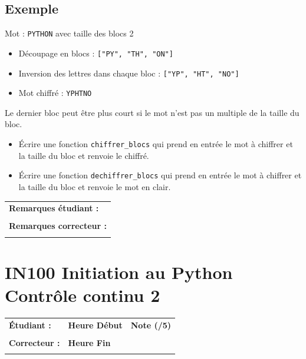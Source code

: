 \documentclass[a4paper,11pt]{article}
\begin{document}
\subsection*{Exemple}

Mot : \texttt{PYTHON}  avec taille des blocs 2  

\begin{itemize}
    \item Découpage en blocs : \texttt{["PY", "TH", "ON"]}  
    \item Inversion des lettres dans chaque bloc : \texttt{["YP", "HT", "NO"]}  
    \item Mot chiffré : \texttt{YPHTNO}  
\end{itemize}

Le dernier bloc peut être plus court si le mot n’est pas un multiple de la taille du bloc.
\vspace*{-0.3 cm}
\begin{itemize}
\item[1.] Écrire une fonction \texttt{chiffrer\_blocs} qui prend en entrée le mot à chiffrer et la taille du bloc et renvoie le chiffré. 
   

\item[2.] Écrire une fonction \texttt{dechiffrer\_blocs} qui prend en entrée le mot à chiffrer et la taille du bloc et renvoie le mot en clair. 

\end{itemize}

\vspace*{-0.2 cm}
\begin{table}[h!]
\centering
\renewcommand{\arraystretch}{1.4} %
\begin{tabular}{|p{15cm}|}
\hline
\textbf{Remarques étudiant :}    \\
 \\
\hline
\textbf{Remarques correcteur :}  \\
 \\
\hline
\end{tabular}
\end{table}


\newpage

\section*{\center IN100 Initiation au Python\\
Contrôle continu 2}


\begin{table}[h!]
\centering
\renewcommand{\arraystretch}{1.4} %
\begin{tabular}{|p{10cm}|p{3cm}|p{2cm}|}
\hline
\textbf{Étudiant :} & \textbf{Heure Début }  & \textbf{Note (/5) }  \\
& & \\
\hline
\textbf{Correcteur :} & \textbf{Heure Fin } & \\
& & \\
\hline

\hline
\end{tabular}
\end{table}
\end{document}
